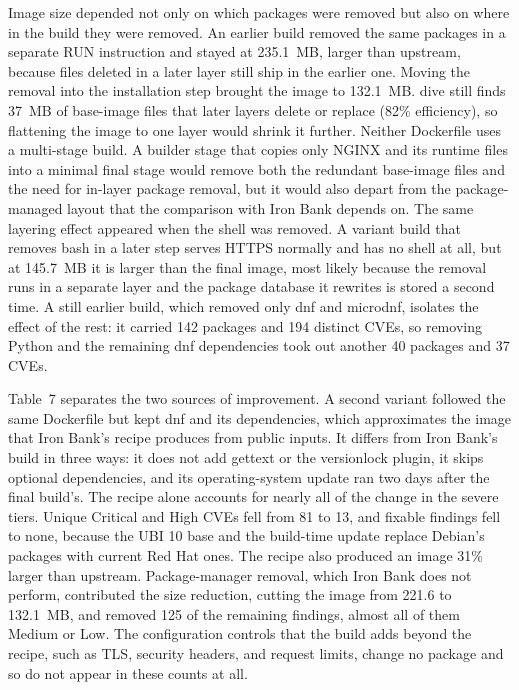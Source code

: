 \documentclass[10pt,letterpaper,twocolumn]{article}
\begin{document}
Image size depended not only on which packages were removed but also on where in the build they were removed. An earlier build removed the same packages in a separate RUN instruction and stayed at 235.1~MB, larger than upstream, because files deleted in a later layer still ship in the earlier one. Moving the removal into the installation step brought the image to 132.1~MB. dive still finds 37~MB of base-image files that later layers delete or replace (82\% efficiency), so flattening the image to one layer would shrink it further. Neither Dockerfile uses a multi-stage build. A builder stage that copies only NGINX and its runtime files into a minimal final stage would remove both the redundant base-image files and the need for in-layer package removal, but it would also depart from the package-managed layout that the comparison with Iron Bank depends on. The same layering effect appeared when the shell was removed. A variant build that removes bash in a later step serves HTTPS normally and has no shell at all, but at 145.7~MB it is larger than the final image, most likely because the removal runs in a separate layer and the package database it rewrites is stored a second time. A still earlier build, which removed only dnf and microdnf, isolates the effect of the rest: it carried 142 packages and 194 distinct CVEs, so removing Python and the remaining dnf dependencies took out another 40 packages and 37 CVEs.

Table~7 separates the two sources of improvement. A second variant followed the same Dockerfile but kept dnf and its dependencies, which approximates the image that Iron Bank's recipe produces from public inputs. It differs from Iron Bank's build in three ways: it does not add gettext or the versionlock plugin, it skips optional dependencies, and its operating-system update ran two days after the final build's. The recipe alone accounts for nearly all of the change in the severe tiers. Unique Critical and High CVEs fell from 81 to 13, and fixable findings fell to none, because the UBI 10 base and the build-time update replace Debian's packages with current Red Hat ones. The recipe also produced an image 31\% larger than upstream. Package-manager removal, which Iron Bank does not perform, contributed the size reduction, cutting the image from 221.6 to 132.1~MB, and removed 125 of the remaining findings, almost all of them Medium or Low. The configuration controls that the build adds beyond the recipe, such as TLS, security headers, and request limits, change no package and so do not appear in these counts at all.
\end{document}
